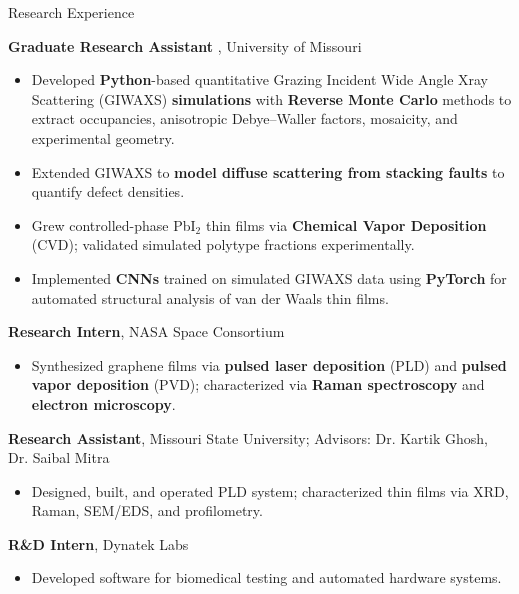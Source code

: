 \begin{rubric}{Research Experience}

    \entry*[2021--Present]%
    \textbf{Graduate Research Assistant} , University of Missouri
    \begin{itemize}
        \item Developed \textbf{Python}-based quantitative Grazing Incident Wide Angle Xray Scattering (GIWAXS) \textbf{simulations} with \textbf{Reverse Monte Carlo} methods to extract occupancies, anisotropic Debye--Waller factors, mosaicity, and experimental geometry.
        \item Extended GIWAXS to \textbf{model diffuse scattering from stacking faults} to quantify defect densities.
        \item Grew controlled-phase PbI$_2$ thin films via \textbf{Chemical Vapor Deposition} (CVD); validated simulated polytype fractions experimentally.
        \item Implemented \textbf{CNNs} trained on simulated GIWAXS data using \textbf{PyTorch} for automated structural analysis of van der Waals thin films.
    \end{itemize}

    \entry*[2019--2020]%
    \textbf{Research Intern}, NASA Space Consortium
    \begin{itemize}
        \item Synthesized graphene films via \textbf{pulsed laser deposition} (PLD) and \textbf{pulsed vapor deposition} (PVD); characterized via \textbf{Raman spectroscopy} and \textbf{electron microscopy}.
    \end{itemize}

    \entry*[2017--2020]%
    \textbf{Research Assistant}, Missouri State University; Advisors: Dr. Kartik Ghosh, Dr. Saibal Mitra
    \begin{itemize}
        \item Designed, built, and operated PLD system; characterized thin films via XRD, Raman, SEM/EDS, and profilometry.
    \end{itemize}

    \entry*[2019]%
    \textbf{R\&D Intern}, Dynatek Labs
    \begin{itemize}
        \item Developed software for biomedical testing and automated hardware systems.
    \end{itemize}

\end{rubric}

